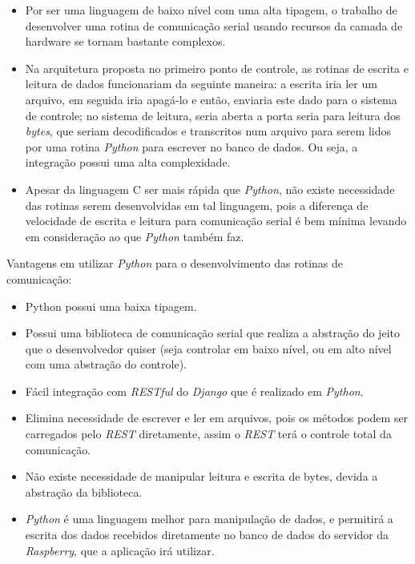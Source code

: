 \begin{itemize}
    \item Por ser uma linguagem de baixo nível com uma alta tipagem, o trabalho de desenvolver uma rotina de comunicação serial usando recursos da camada de hardware se tornam bastante complexos.
    \item Na arquitetura proposta no primeiro ponto de controle, as rotinas de escrita e leitura de dados funcionariam da seguinte maneira: a escrita iria ler um arquivo, em seguida iria apagá-lo e então, enviaria este dado para o sistema de controle; no sistema de leitura, seria aberta a porta seria para leitura dos \textit{bytes}, que seriam decodificados e transcritos num arquivo para serem lidos por uma rotina \textit{Python} para escrever no banco de dados. Ou seja, a integração possui uma alta complexidade.
    \item Apesar da linguagem C ser mais rápida que \textit{Python}, não existe necessidade das rotinas serem desenvolvidas em tal linguagem, pois a diferença de velocidade de escrita e leitura para comunicação serial é bem mínima levando em consideração ao que \textit{Python} também faz.
\end{itemize}

Vantagens em utilizar \textit{Python} para o desenvolvimento das rotinas de comunicação:

\begin{itemize}
    \item Python possui uma baixa tipagem.
    \item Possui uma biblioteca de comunicação serial que realiza a abstração do jeito que o desenvolvedor quiser (seja controlar em baixo nível, ou em alto nível com uma abstração do controle).
    \item Fácil integração com \textit{RESTful} do \textit{Django} que é realizado em \textit{Python}.
    \item Elimina necessidade de escrever e ler em arquivos, pois os métodos podem ser carregados pelo \textit{REST} diretamente, assim o \textit{REST} terá o controle total da comunicação.
    \item Não existe necessidade de manipular leitura e escrita de bytes, devida a abstração da biblioteca.
    \item \textit{Python} é uma linguagem melhor para manipulação de dados, e permitirá a escrita dos dados recebidos diretamente no banco de dados do servidor da \textit{Raspberry}, que a aplicação irá utilizar.
\end{itemize}

